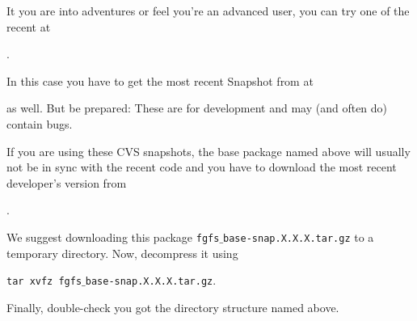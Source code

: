 It you are into adventures or feel you're an advanced user, you can try one of the recent  at
  \medskip

.
 \medskip

 \noindent
In this case you have to get the most recent Snapshot from \SimGear{} at
 \medskip

 \medskip

 \noindent
 as well. But be prepared: These are for development and may (and often do)
contain bugs.

If you are using these CVS snapshots, the base package named above will usually not be
in sync with the recent code and you have to download the most recent developer's version
from
 \medskip

 .
 \medskip

\noindent
We suggest downloading this package \texttt{fgfs$\_$base-snap.X.X.X.tar.gz} to a temporary
directory. Now, decompress it using
\medskip

 \texttt{tar xvfz fgfs$\_$base-snap.X.X.X.tar.gz}.
 \medskip
 
Finally, double-check you got the directory structure named above.


